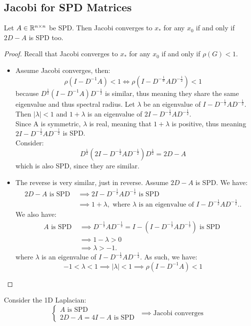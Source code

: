 \documentclass[../main/main.tex]{subfiles}
\begin{document}
\subsection{Jacobi for SPD Matrices}
\begin{theorem}
Let $A\in\mathbb{R}^{n \times n}$ be SPD. Then Jacobi converges to $x_{*}$ for any $x_{0}$ if and only if $2D-A$ is SPD too.
\end{theorem}
\begin{proof}
  Recall that Jacobi converges to $x_{*}$ for any $x_{0}$ if and only if $\rho(G)< 1$.
  \begin{itemize}
    \item Assume Jacobi converges, then: \[
          \rho(I-D^{-1} A) < 1 \iff \rho(I-D^{-\frac{1}{w}} A D^{-\frac{1}{2}}) < 1
          \] because $D^{\frac{1}{2}}(I-D^{-1}A)D^{-\frac{1}{2}}$ is similar, thus meaning they share the same eigenvalue and thus spectral radius. Let $\lambda$ be an eigenvalue of $I-D^{-\frac{1}{2}}A D^{-\frac{1}{2}}$. Then $|\lambda|<1$ and $1+\lambda$ is an eigenvalue of $2I -D^{-\frac{1}{2}}A D^{-\frac{1}{2}}$. \\

          Since A is symmetric, $\lambda$ is real, meaning that $1+\lambda$ is positive, thus meaning $2I-D^{-\frac{1}{2}}A D^{-\frac{1}{2}}$ is SPD. \\

          Consider: \[
D^{\frac{1}{2}}(2I-D^{-\frac{1}{2}}A D^{-\frac{1}{2}})D^{\frac{1}{2}} = 2D - A
          \] which is also SPD, since they are similar.
    \item The reverse is very similar, just in reverse. Assume $2D-A$ is SPD. We have:
          \begin{align*}
          2D - A \text{ is SPD }&\implies 2I-D^{-\frac{1}{2}}A D^{-\frac{1}{2}}\text{ is SPD }\\
          &\implies 1+\lambda, \text{ where $\lambda$ is an eigenvalue of $I-D^{-\frac{1}{2}}A D^{-\frac{1}{2}}$.}
            .\end{align*}
          We also have:
          \begin{align*}
            A \text{ is SPD }&\implies D^{-\frac{1}{2}}A D^{-\frac{1}{2}} = I-(I-D^{-\frac{1}{2}}A D^{-\frac{1}{2}}) \text{ is SPD }\\
                             & \implies 1-\lambda > 0 \\
            & \implies \lambda> -1
              .\end{align*} where $\lambda$ is an eigenvalue of $I - D^{-\frac{1}{2}}A D^{-\frac{1}{2}}$.
          As such, we have: \[
          -1<\lambda<1 \implies |\lambda| < 1 \implies \rho(I-D^{-1} A)<1
          \]
  \end{itemize}
\end{proof}
\begin{example}
  Consider the 1D Laplacian: \[
\begin{cases}
  A \text{ is SPD}\\
  2D - A = 4I-A \text{ is SPD }
\end{cases}\implies \text{Jacobi converges}
  \]
\end{example}
\end{document}
